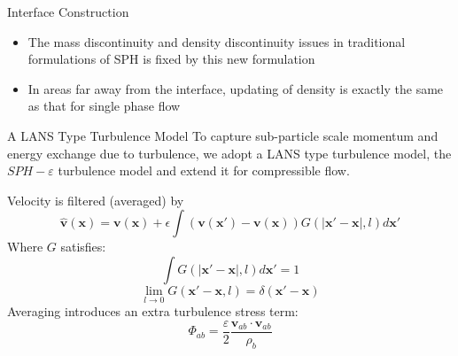 \documentclass{beamer}
\begin{document}
\begin{frame}{Interface Construction}
\begin{minipage}{0.27 \textwidth}
\begin{figure}
\end{figure}
\end{minipage}

\begin{block}{}
  \begin{itemize}
    \item {The mass discontinuity and density discontinuity issues in traditional formulations of SPH is fixed by this new formulation
    } 
    \item {In areas far away from the interface, updating of density is exactly the same as that for single phase flow
    }
 \end{itemize}
\end{block}
\end{frame}

\begin{frame}{A LANS Type Turbulence Model}
To capture sub-particle scale momentum and energy exchange due to turbulence, we adopt a LANS type turbulence model, the $SPH-\varepsilon$ turbulence model and extend it for compressible flow.\\
\noindent
\begin{minipage}{0.65 \textwidth}
Velocity is filtered (averaged) by
\begin{equation}
\widehat{\textbf{v}}\left(\textbf{x}\right)=\textbf{v}\left(\textbf{x}\right)+ \epsilon \int \left(\textbf{v}\left(\textbf{x} \prime\right)-\textbf{v}\left(\textbf{x}\right)\right)G\left(\vert \textbf{x} \prime - \textbf{x} \vert, l\right) d\textbf{x} \prime
\end{equation}
Where $G$ satisfies:
\begin{equation}
\int G\left(\vert \textbf{x} \prime - \textbf{x} \vert, l\right) d\textbf{x} \prime =1
\end{equation}
\begin{equation}
\lim _{l \rightarrow 0} G\left(\textbf{x} \prime-\textbf{x}, l\right) =  \delta \left(\textbf{x} \prime - \textbf{x}\right)
\label{eq:SPH_kernel_delta}
\end{equation}
Averaging introduces an extra turbulence stress term:
\begin{equation}
\Phi_{ab}=\dfrac{\varepsilon}{2} \dfrac{\textbf{v}_{ab} \cdot \textbf{v}_{ab}}{\rho_b} \label{eq:_LANS_trub_stress}
\end{equation}
\end{minipage}
%
\begin{minipage}{0.34 \textwidth}
\begin{figure}

\end{figure}
\end{minipage}
\end{frame}
\end{document}
